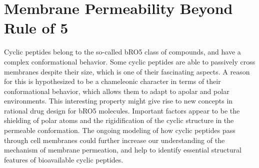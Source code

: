 
\section{Membrane Permeability Beyond Rule of 5}
Cyclic peptides belong to the so-called bRO5 class of compounds, and have a complex conformational behavior. Some cyclic peptides are able to passively cross membranes despite their size, which is one of their fascinating aspects.\cite{Rezai2006, Rezai2006A, Matsson2017,Whitty2016} 
A reason for this is hypothesized to be a chameleonic character in terms of their conformational behavior, which allows them to adapt to apolar and polar environments.\cite{Witek2016, Witek2017, Witek2019, Wang2021} This interesting property might give rise to new concepts in rational drug design for bRO5 molecules.
Important factors appear to be the shielding of polar atoms and the rigidification of the cyclic structure in the permeable conformation.\cite{Witek2019, Wang2021} 
The ongoing modeling of how cyclic peptides pass through cell membranes could further increase our understanding of the mechanism of membrane permeation, and help to identify essential structural features of bioavailable cyclic peptides.



